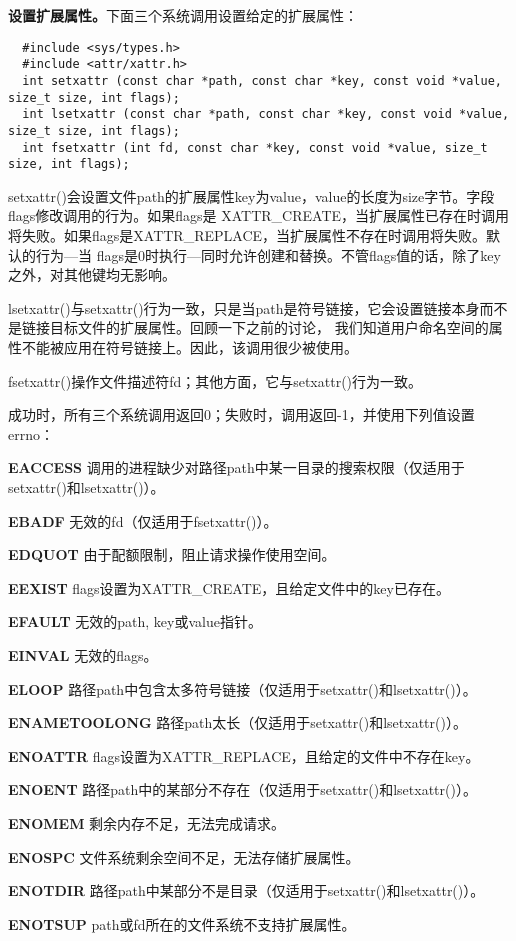 \textbf{设置扩展属性。}下面三个系统调用设置给定的扩展属性：

\begin{lstlisting}
  #include <sys/types.h>
  #include <attr/xattr.h>
  int setxattr (const char *path, const char *key, const void *value, size_t size, int flags);
  int lsetxattr (const char *path, const char *key, const void *value, size_t size, int flags);
  int fsetxattr (int fd, const char *key, const void *value, size_t size, int flags);
\end{lstlisting}

setxattr()会设置文件path的扩展属性key为value，value的长度为size字节。字段flags修改调用的行为。如果flags是 XATTR\_CREATE，当扩展属性已存在时调用将失败。如果flags是XATTR\_REPLACE，当扩展属性不存在时调用将失败。默认的行为—当 flags是0时执行—同时允许创建和替换。不管flags值的话，除了key之外，对其他键均无影响。

lsetxattr()与setxattr()行为一致，只是当path是符号链接，它会设置链接本身而不是链接目标文件的扩展属性。回顾一下之前的讨论， 我们知道用户命名空间的属性不能被应用在符号链接上。因此，该调用很少被使用。

fsetxattr()操作文件描述符fd；其他方面，它与setxattr()行为一致。

成功时，所有三个系统调用返回0；失败时，调用返回-1，并使用下列值设置errno：

\begin{eqlist*}
\item[\textbf{EACCESS}] 调用的进程缺少对路径path中某一目录的搜索权限（仅适用于setxattr()和lsetxattr()）。
\item[\textbf{EBADF}] 无效的fd（仅适用于fsetxattr()）。
\item[\textbf{EDQUOT}] 由于配额限制，阻止请求操作使用空间。
\item[\textbf{EEXIST}] flags设置为XATTR\_CREATE，且给定文件中的key已存在。
\item[\textbf{EFAULT}] 无效的path, key或value指针。
\item[\textbf{EINVAL}] 无效的flags。
\item[\textbf{ELOOP}] 路径path中包含太多符号链接（仅适用于setxattr()和lsetxattr()）。
\item[\textbf{ENAMETOOLONG}] 路径path太长（仅适用于setxattr()和lsetxattr()）。
\item[\textbf{ENOATTR}] flags设置为XATTR\_REPLACE，且给定的文件中不存在key。
\item[\textbf{ENOENT}] 路径path中的某部分不存在（仅适用于setxattr()和lsetxattr()）。
\item[\textbf{ENOMEM}] 剩余内存不足，无法完成请求。
\item[\textbf{ENOSPC}] 文件系统剩余空间不足，无法存储扩展属性。
\item[\textbf{ENOTDIR}] 路径path中某部分不是目录（仅适用于setxattr()和lsetxattr()）。
\item[\textbf{ENOTSUP}] path或fd所在的文件系统不支持扩展属性。
\end{eqlist*}

